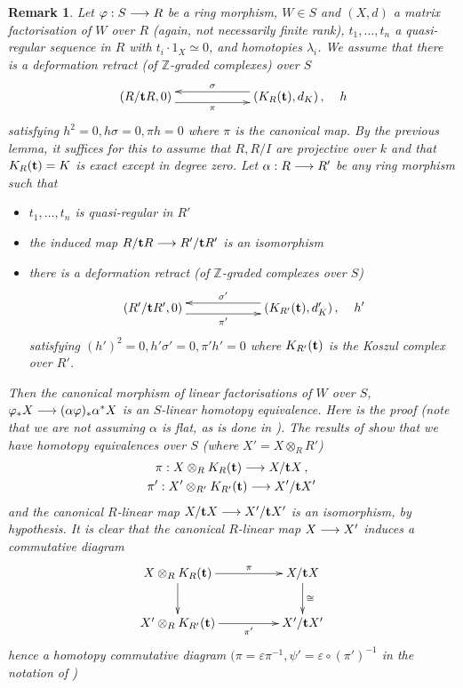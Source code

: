\documentclass[english,letter paper,12pt,leqno]{article}
\theoremstyle{example}
\newtheorem{remark}[theorem]{Remark}
\numberwithin{equation}{section}
\def\be{\begin{equation}}
\def\ee{\end{equation}}
\begin{document}
\begin{remark}\label{remark:fixing_dm} Let $\varphi: S \longrightarrow R$ be a ring morphism, $W \in S$ and $(X,d)$ a matrix factorisation of $W$ over $R$ (again, not necessarily finite rank), $t_1,\ldots,t_n$ a quasi-regular sequence in $R$ with $t_i \cdot 1_X \simeq 0$, and homotopies $\lambda_i$. We assume that there is a deformation retract (of $\mathbb{Z}$-graded complexes) over $S$
\be\label{eq:fixing_dm_1}
\xymatrix@C+3pc{
(R/\bold{t} R,0) \ar@<-1ex>[r]_-\pi & (K_R(\bold{t}),d_K)\,, \ar@<-1ex>[l]_-\sigma
}\quad h
\ee
satisfying $h^2 = 0, h \sigma = 0, \pi h = 0$ where $\pi$ is the canonical map. By the previous lemma, it suffices for this to assume that $R,R/I$ are projective over $k$ and that $K_R(\bold{t}) = K$ is exact except in degree zero. Let $\alpha: R \longrightarrow R'$ be any ring morphism such that
\begin{itemize}
\item $t_1,\ldots,t_n$ is quasi-regular in $R'$
\item the induced map $R/\bold{t} R \longrightarrow R'/\bold{t} R'$ is an isomorphism
\item there is a deformation retract (of $\mathbb{Z}$-graded complexes over $S$)
\be\label{eq:fixing_dm_2}
\xymatrix@C+3pc{
(R'/\bold{t} R',0) \ar@<-1ex>[r]_-{\pi'} & (K_{R'}(\bold{t}), d'_K)\,, \ar@<-1ex>[l]_-{\sigma'}
}\quad h'
\ee
satisfying $(h')^2 = 0, h'\sigma' = 0, \pi' h' = 0$ where $K_{R'}(\bold{t})$ is the Koszul complex over $R'$.
\end{itemize}
Then the canonical morphism of linear factorisations of $W$ over $S$, $\varphi_* X \longrightarrow (\alpha \varphi)_* \alpha^* X$ is an $S$-linear homotopy equivalence. Here is the proof (note that we are not assuming $\alpha$ is flat, as is done in \cite[Remark 7.7]{pushforward}). The results of \cite{pushforward} show that we have homotopy equivalences over $S$ (where $X' = X \otimes_R R'$)
\begin{gather*}
\pi: X \otimes_R K_R(\bold{t}) \longrightarrow X/\bold{t} X\,,\\
\pi': X' \otimes_{R'} K_{R'}(\bold{t}) \longrightarrow X'/\bold{t} X'
\end{gather*}
and the canonical $R$-linear map $X/\bold{t} X \longrightarrow X'/\bold{t} X'$ is an isomorphism, by hypothesis. It is clear that the canonical $R$-linear map $X \longrightarrow X'$ induces a commutative diagram
\[
\xymatrix@C+2pc{
X \otimes_R K_R(\bold{t}) \ar[d]\ar[r]^-\pi & X/\bold{t} X \ar[d]^-{\cong}\\
X' \otimes_R K_{R'}(\bold{t}) \ar[r]_-{\pi'} & X'/\bold{t} X'
}
\]
hence a homotopy commutative diagram $(\pi = \varepsilon \pi^{-1}, \psi' = \varepsilon \circ (\pi')^{-1}$ in the notation of \cite{pushforward})

\end{remark}
\end{document}
